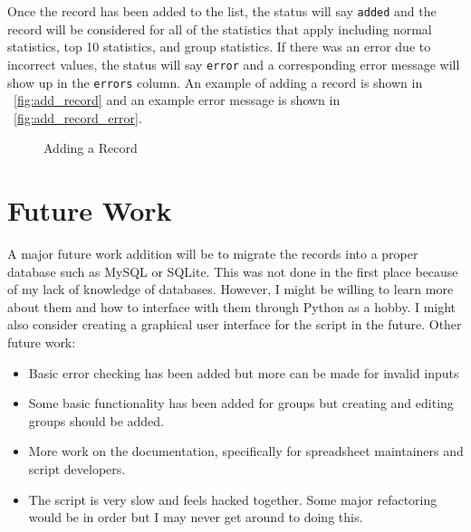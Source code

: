 Once the record has been added to the list, the status will say \texttt{added} and the record will be considered for all of the statistics that apply including normal statistics, top 10 statistics, and group statistics. If there was an error due to incorrect values, the status will say \texttt{error} and a corresponding error message will show up in the \texttt{errors} column. An example of adding a record is shown in \figurename\ \ref{fig:add_record} and an example error message is shown in \figurename\ \ref{fig:add_record_error}.
\begin{figure}[htb!]
\centering
{}
\caption{Adding a Record}
\end{figure}

\section{Future Work}
A major future work addition will be to migrate the records into a proper database such as MySQL or SQLite. This was not done in the first place because of my lack of knowledge of databases. However, I might be willing to learn more about them and how to interface with them through Python as a hobby. I might also consider creating a graphical user interface for the script in the future. Other future work:
\begin{itemize}
\item Basic error checking has been added but more can be made for invalid inputs
\item Some basic functionality has been added for groups but creating and editing groups should be added.
\item More work on the documentation, specifically for spreadsheet maintainers and script developers.
\item The script is very slow and feels hacked together. Some major refactoring would be in order but I may never get around to doing this.
\end{itemize}
